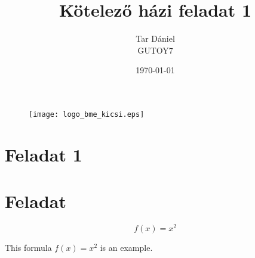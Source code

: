 \documentclass{article}
\begin{document}
	
\setlength{\headheight}{20pt}
\vspace{15cm}
\title{\huge Kötelező házi feladat 1
		}
\author{Tar Dániel\\GUTOY7}
\date{\today}
\maketitle
\thispagestyle{fancy}

\begin{figure}
	\begin{center}
		\texttt{[image: logo\_bme\_kicsi.eps]}
	\end{center}
\end{figure}

\newpage
\setlength{\headheight}{0pt}
\tableofcontents

\section{Feladat 1}
\section{Feladat}

\begin{equation}
	f(x)=x^2
\end{equation}

This formula $f(x) = x^2$ is an example.
\end{document}
